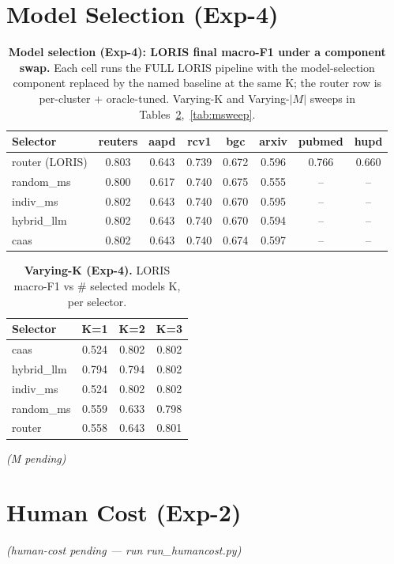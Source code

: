 \documentclass[11pt]{article}
\begin{document}
\section{Model Selection (Exp-4)}
\begin{table}[h]\centering\footnotesize\setlength{\tabcolsep}{4pt}
\caption{\textbf{Model selection (Exp-4): LORIS final macro-F1 under a component swap.}
Each cell runs the FULL LORIS pipeline with the model-selection component replaced by the
named baseline at the same K; the router row is per-cluster + oracle-tuned. Varying-K and
Varying-$|M|$ sweeps in Tables~\ref{tab:ksweep},~\ref{tab:msweep}.}
\label{tab:select}
\begin{tabular}{lccccccc}
\toprule
Selector & \textbf{reuters} & \textbf{aapd} & \textbf{rcv1} & \textbf{bgc} & \textbf{arxiv} & \textbf{pubmed} & \textbf{hupd} \\
\midrule
\rowcolor{blue!8}\quad router (LORIS) & 0.803 & 0.643 & 0.739 & 0.672 & 0.596 & 0.766 & 0.660 \\
\quad random\_ms & 0.800 & 0.617 & 0.740 & 0.675 & 0.555 & -- & -- \\
\quad indiv\_ms & 0.802 & 0.643 & 0.740 & 0.670 & 0.595 & -- & -- \\
\quad hybrid\_llm & 0.802 & 0.643 & 0.740 & 0.670 & 0.594 & -- & -- \\
\quad caas & 0.802 & 0.643 & 0.740 & 0.674 & 0.597 & -- & -- \\
\bottomrule
\end{tabular}
\end{table}
\begin{table}[h]\centering\footnotesize
\caption{\textbf{Varying-K (Exp-4).} LORIS macro-F1 vs \# selected models K, per selector.}
\label{tab:ksweep}
\begin{tabular}{lccc}
\toprule
Selector & K=1 & K=2 & K=3 \\
\midrule
\quad caas & 0.524 & 0.802 & 0.802 \\
\quad hybrid\_llm & 0.794 & 0.794 & 0.802 \\
\quad indiv\_ms & 0.524 & 0.802 & 0.802 \\
\quad random\_ms & 0.559 & 0.633 & 0.798 \\
\quad router & 0.558 & 0.643 & 0.801 \\
\bottomrule
\end{tabular}
\end{table}
\emph{(M pending)}
\section{Human Cost (Exp-2)}
\emph{(human-cost pending — run run\_humancost.py)}
\end{document}
